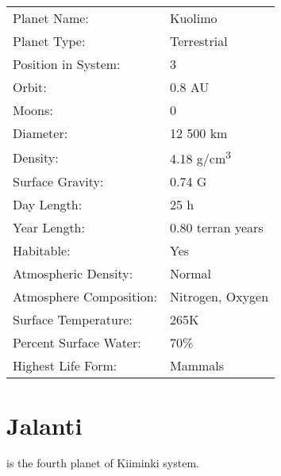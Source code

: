 \documentclass{tufte-book}
\begin{document}
\bigskip
\begin{minipage}{\textwidth}
\begin{center}
\begin{tabular}{ll}
\toprule
Planet Name: & Kuolimo \\
Planet Type: & Terrestrial \\
Position in System: & 3 \\
Orbit: & 0.8 AU \\
Moons: & 0 \\
Diameter: & 12 500 km \\
Density: & 4.18 g/cm\textsuperscript{3} \\
Surface Gravity: & 0.74 G \\
Day Length: & 25 h \\
Year Length: & 0.80 terran years \\
Habitable: & Yes \\
\quad Atmospheric Density: & Normal \\
\quad Atmosphere Composition: & Nitrogen, Oxygen \\
\quad Surface Temperature: & 265K \\
\quad Percent Surface Water: & 70\% \\
\quad Highest Life Form: & Mammals \\

\bottomrule
\end{tabular}
\end{center}
\end{minipage}

\section{Jalanti}

 is the fourth planet of Kiiminki system.
\end{document}
